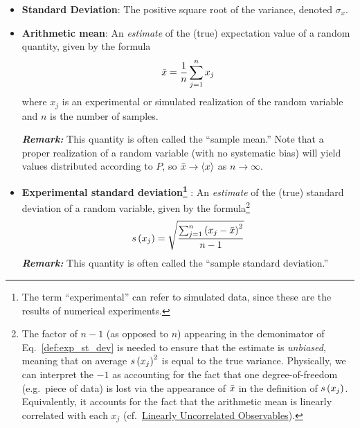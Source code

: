 \begin{itemize}
\item {\bf Standard Deviation}: The positive square root of the variance, denoted $\sigma_x$.\label{def:st_dev}

\item {\bf Arithmetic mean}: An \emph{estimate} of the (true) expectation value of a random quantity, given by the formula
  \begin{equation}
    \bar{x} = \dfrac{1}{n} \sum_{j=1}^{n} x_j \label{def:arith_mean}
  \end{equation}
  where $x_j$ is an experimental or simulated realization of the random variable and $n$ is the number of samples. 
\smallskip 

\textbf{\textit{Remark:}} This quantity is often called the ``sample mean.''
Note that a proper realization of a random variable (with no systematic bias) will yield values distributed according to $P$, so $\bar{x} \rightarrow \langle x \rangle$ as $n \rightarrow \infty$.

\item {\bf Experimental standard deviation\footnote{
      The term ``experimental'' can refer to simulated data, since these are the results of numerical experiments.
}
}: An \emph{estimate} of the (true) standard deviation of a random variable, given by the formula\footnote{The factor of $n-1$ (as opposed to $n$) appearing in the demonimator of Eq.~\ref{def:exp_st_dev} is needed to ensure that the estimate is {\it unbiased}, meaning that on average $s\left( x_j \right)^2$ is equal to the true variance. Physically, we can interpret the $-1$ as accounting for the fact that one degree-of-freedom (e.g.\ piece of data) is lost via the appearance of $\bar{x}$ in the definition of $s\left( x_j \right)$.  Equivalently, it accounts for the fact that the arithmetic mean is linearly correlated with each $x_j$ (cf.\ \hyperref[def:unc_obs]{Linearly Uncorrelated Observables}).}
  \begin{equation}
    s\left( x_j \right) = \sqrt{\dfrac{\sum_{j=1}^n\left(x_j - \bar{x}\right)^2}{n-1}} \label{def:exp_st_dev}
  \end{equation}
  \smallskip
  \textbf{\textit{Remark:}} This quantity is often called the ``sample standard deviation.'' 



\end{itemize}
